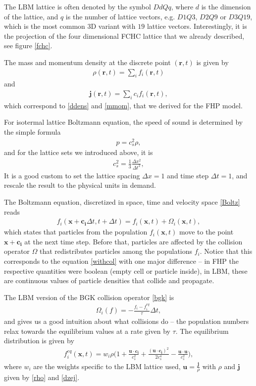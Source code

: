 The LBM lattice is often denoted by the symbol $DdQq$, where $d$ is the dimension of the lattice, and $q$ is the number of lattice vectors, e.g. $D1Q3$, $D2Q9$ or $D3Q19$, which is the most common 3D variant with $19$ lattice vectors. Interestingly, it is the projection of the four dimensional FCHC lattice that we already described, see figure \ref{fchc}.

The mass and momentum density at the discrete point $(\bm{r},t)$ is given by
\begin{align} \label{rho}
\rho(\bm{r},t) = \sum_i f_i(\bm{r},t)
\end{align}
and
\begin{align} \label{dzej}
\bm{j}(\bm{r},t) = \sum_i c_i f_i(\bm{r},t),
\end{align}
which correspond to \ref{ddens} and \ref{mmom}, that we derived for the FHP model.

For isotermal lattice Boltzmann equation, the speed of sound is determined by the simple formula
\begin{align*}
p = c_s^2 \rho,
\end{align*}
and for the lattice sets we introduced above, it is
\begin{align*}
c_s^2 = \frac{1}{3} \frac{\Delta x^2}{\Delta t^2},
\end{align*}
It is a good custom to set the lattice spacing $\Delta x = 1$  and time step $\Delta t = 1$, and rescale the result to the physical units in demand.

The Boltzmann equation, discretized in space, time and velocity space \ref{Boltz} reads
\begin{align} \label{updt}
f_i(\bm{x} + \bm{c_i}\Delta t, t + \Delta t) = f_i(\bm{x},t) + \Omega_i(\bm{x},t),
\end{align}
which states that particles from the population $f_i(\bm{x},t)$ move to the point $\bm{x + c_i}$ at the next time step. Before that, particles are affected by the collision operator $\Omega$ that redistributes particles among the populations $f_i$.
Notice that this corresponds to the equation \ref{withcol} with one major difference -- in FHP the respective quantities were boolean (empty cell or particle inside), in LBM, these are continuous values of particle densities that collide and propagate.

The LBM version of the BGK collision operator \ref{bgk} is
\begin{align} \label{collar}
\Omega_i(f) = - \frac{f_i - f_i^{eq}}{\tau} \Delta t,
\end{align}
and gives us a good intuition about what collisions do -- the population numbers relax towards the equilibrium values at a rate given by $\tau$.
The equilibrium distribution is given by
\begin{align} \label{mbcomp}
f_i^{eq}(\bm{x},t) = w_i \rho \Big( 1 + \frac{\bm{u} \cdot \bm{c_i}}{c_s^2} + \frac{(\bm{u} \cdot \bm{c_i})^2}{2 c_s^4} - \frac{\bm{u} \cdot \bm{u}}{c_s^2}\Big),
\end{align}
where $w_i$ are the weights specific to the LBM lattice used, $\bm{u} = \frac{\bm{j}}{\rho}$ with $\rho$ and $\bm{j}$ given by \ref{rho} and \ref{dzej}.

